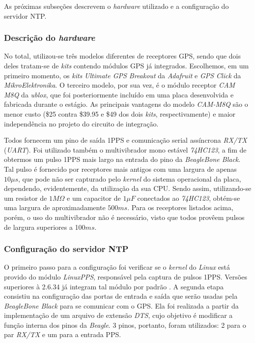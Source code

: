\vspace{12pt}

As próximas subseções descrevem o \textit{hardware} utilizado e a
configuração do servidor NTP.

\subsubsection{Descrição do \textit{hardware}}

No total, utilizou-se três modelos diferentes de receptores GPS, sendo que dois
deles tratam-se de \textit{kits} contendo módulos GPS já integrados. Escolhemos,
em um primeiro momento, os \textit{kits} \textit{Ultimate GPS Breakout} da
\textit{Adafruit} e \textit{GPS Click} da \textit{MikroElektronika}. O terceiro
modelo, por sua vez, é o módulo receptor \textit{CAM M8Q} da \textit{ublox}, que
foi posteriormente incluído em uma placa desenvolvida e fabricada durante o
estágio. As principais vantagens do modelo \textit{CAM-M8Q} são o menor custo
(\$25 contra \$39.95 e \$49 dos dois \textit{kits}, respectivamente) e maior
independência no projeto do circuito de integração.

\vspace{12pt}

Todos fornecem um pino de saída 1PPS e comunicação serial assíncrona
\textit{RX/TX} (\textit{UART}). Foi utilizado também o multivibrador mono
estável \textit{74HC123}, a fim de obtermos um pulso 1PPS mais largo na entrada
do pino da \textit{BeagleBone Black}. Tal pulso é fornecido por receptores mais
antigos com uma largura de apenas \(10\mu s\), que pode não ser capturado pelo
\textit{kernel} do sistema operacional da placa, dependendo, evidentemente, da
utilização da sua CPU. Sendo assim, utilizando-se um resistor de \(1M\Omega\) e
um capacitor de \(1\mu F\) conectados ao \textit{74HC123}, obtém-se uma largura
de aproximadamente \(500 ms\). Para os receptores listados acima, porém, o uso
do multivibrador não é necessário, visto que todos provêem pulsos de largura superiores a 100\(ms\).

\subsubsection{Configuração do servidor NTP}

O primeiro passo para a configuração foi verificar se o \textit{kernel} do
\textit{Linux} está provido do módulo \textit{LinuxPPS}, responsável pela
captura de pulsos 1PPS. Versões superiores à 2.6.34 já integram tal módulo por
padrão \cite{linuxpps}. A segunda etapa consistiu na configuração das portas de
entrada e saída que serão usadas pela \textit{BeagleBone Black} para se comunicar com o
GPS. Ela foi realizada a partir da implementação de um arquivo de extensão
\textit{DTS}, cujo objetivo é modificar a função interna dos pinos da
\textit{Beagle}. 3 pinos, portanto, foram utilizados: 2 para o par
\textit{RX/TX} e um para a entrada PPS. 

